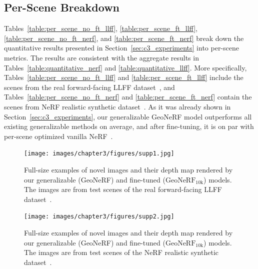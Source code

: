 \subsection{Per-Scene Breakdown}
Tables~\ref{table:per_scene_no_ft_llff}, \ref{table:per_scene_ft_llff}, \ref{table:per_scene_no_ft_nerf}, and \ref{table:per_scene_ft_nerf} break down the quantitative results presented in Section~\ref{sec:c3_experiments} into per-scene metrics. The results are consistent with the aggregate results in Tables~\ref{table:quantitative_nerf} and \ref{table:quantitative_llff}. More specifically, Tables~\ref{table:per_scene_no_ft_llff} and \ref{table:per_scene_ft_llff} include the scenes from the real forward-facing LLFF dataset~\citep{mildenhall2019llff}, and Tables~\ref{table:per_scene_no_ft_nerf} and \ref{table:per_scene_ft_nerf} contain the scenes from NeRF realistic synthetic dataset~\citep{mildenhall2020nerf}. As it was already shown in Section~\ref{sec:c3_experiments}, our generalizable GeoNeRF model outperforms all existing generalizable methods on average, and after fine-tuning, it is on par with per-scene optimized vanilla NeRF~\citep{mildenhall2020nerf}.

\begin{figure}[t]
    \begin{center}
        \texttt{[image: images/chapter3/figures/supp1.jpg]}
    \end{center}
   \caption{Full-size examples of novel images and their depth map rendered by our generalizable (GeoNeRF) and fine-tuned ($\text{GeoNeRF}_{\text{10k}}$) models. The images are from test scenes of the real forward-facing LLFF dataset~\citep{mildenhall2019llff}.}
    \label{fig:c3_supp_llff}
\end{figure}

\begin{figure}[t]
    \begin{center}
        \texttt{[image: images/chapter3/figures/supp2.jpg]}
    \end{center}
   \caption{Full-size examples of novel images and their depth map rendered by our generalizable (GeoNeRF) and fine-tuned ($\text{GeoNeRF}_{\text{10k}}$) models. The images are from test scenes of the NeRF realistic synthetic dataset~\citep{mildenhall2020nerf}.}
    \label{fig:c3_supp_nerf}
\end{figure}
\FloatBarrier


